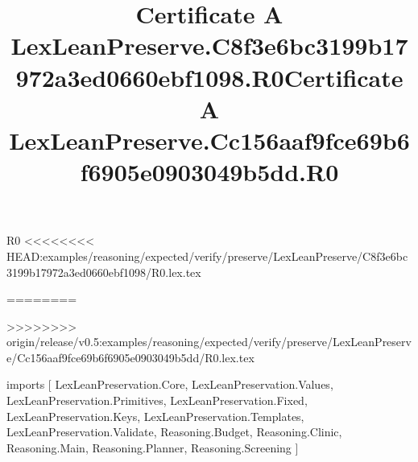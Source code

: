 \begin{lexlean}{R0}
<<<<<<<< HEAD:examples/reasoning/expected/verify/preserve/LexLeanPreserve/C8f3e6bc3199b17972a3ed0660ebf1098/R0.lex.tex
\title{Certificate A LexLeanPreserve.C8f3e6bc3199b17972a3ed0660ebf1098.R0}
========
\title{Certificate A LexLeanPreserve.Cc156aaf9fce69b6f6905e0903049b5dd.R0}
>>>>>>>> origin/release/v0.5:examples/reasoning/expected/verify/preserve/LexLeanPreserve/Cc156aaf9fce69b6f6905e0903049b5dd/R0.lex.tex
\begin{coremodule}
imports [
  LexLeanPreservation.Core,
  LexLeanPreservation.Values,
  LexLeanPreservation.Primitives,
  LexLeanPreservation.Fixed,
  LexLeanPreservation.Keys,
  LexLeanPreservation.Templates,
  LexLeanPreservation.Validate,
  Reasoning.Budget,
  Reasoning.Clinic,
  Reasoning.Main,
  Reasoning.Planner,
  Reasoning.Screening
]


\end{coremodule}
\end{lexlean}
